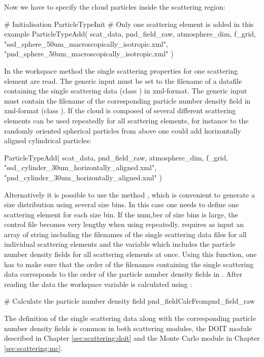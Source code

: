 Now we have to specify the cloud particles inside the scattering
region:
\begin{code}
# Initialisation
ParticleTypeInit
# Only one scattering element is added in this example 
ParticleTypeAdd( scat_data, pnd_field_raw,
                 atmosphere_dim, f_grid,
                 "ssd_sphere_50um_macroscopically_isotropic.xml",
                 "pnd_sphere_50um_macroscopically_isotropic.xml" )
\end{code}
In the workspace method  the single
scattering properties for one scattering element are read. The
generic input  must be set to
the filename of a datafile containing the single scattering data (class
) in xml-format. The generic input
 must contain the filename of the
corresponding particle number density field in xml-format (class
). If the cloud is composed of several
different scattering elements  can be used
repeatedly for all scattering elements, for instance to the
randomly oriented spherical particles from above one could add horizontally aligned
cylindrical particles:
\begin{code}
ParticleTypeAdd( scat_data, pnd_field_raw,
                 atmosphere_dim, f_grid,
                 "ssd_cylinder_30um_horizontally_aligned.xml",
                 "pnd_cylinder_30um_horizontally_aligned.xml" )
\end{code}
Alternatively it is possible to use the method
, which is convenient to generate a size
distribution using several size bins. In this case one needs to define
one scattering element for each size bin. If the num,ber of size bins is large,
the control file
becomes very lengthy when using 
repeatedly.  requires as input an array
of string including the filenames of the single scattering data files for all
individual scattering elements
and the variable  which includes the particle
number density fields for all scattering elements at once. Using this function, one
has to make sure that the order of the filenames containing the single
scattering data corresponds to the order of the particle number
density fields in .
After reading the data the workspace variable  is
calculated using : 
\begin{code}
# Calculate the particle number density field
pnd_fieldCalcFrompnd_field_raw
\end{code}

The definition of the single scattering data along with the
corresponding particle number density fields is common in both
scattering modules, the DOIT module described in 
Chapter \ref{sec:scattering:doit} and the Monte Carlo module in
Chapter \ref{sec:scattering:mc}.


